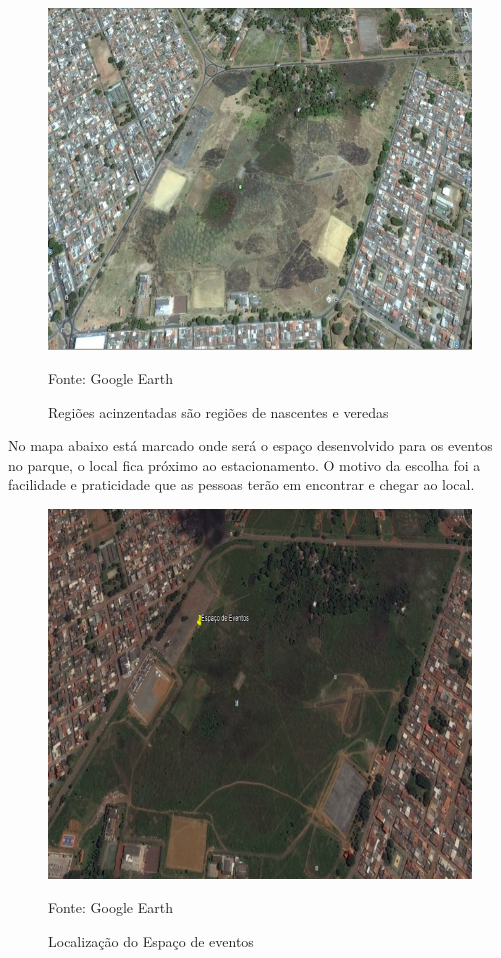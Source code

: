 \begin{figure}[H]
	 \centering
	\label{Regiões das nascentes e vederedas}
	 \includegraphics[keepaspectratio=true,scale=0.8]{figuras/RegioesDasNascentes.png}
	 \caption{Regiões acinzentadas são regiões de nascentes e veredas}
	 \small{Fonte: Google Earth}
\end{figure}

	No mapa abaixo está marcado onde será o espaço desenvolvido para os eventos no parque, o local fica próximo ao estacionamento. O motivo da escolha foi a facilidade e praticidade que as pessoas terão em encontrar e chegar ao local.

\begin{figure}[H]
	 \centering
	\label{Localização do espaço de eventos}
	 \includegraphics[keepaspectratio=true,scale=0.8]{figuras/LocalEspacoEvento.png}
	 \caption{Localização do Espaço de eventos}
	 \small{Fonte: Google Earth}
\end{figure}

